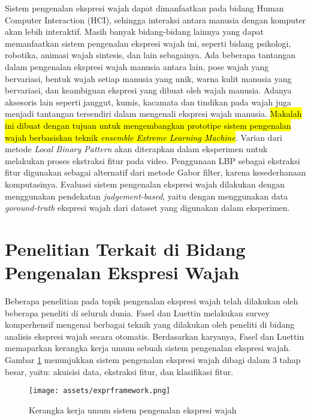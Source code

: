 \documentclass[review,3p,12pt]{elsarticle}
\begin{document}
Sistem pengenalan ekspresi wajah dapat dimanfaatkan pada bidang Human Computer Interaction (HCI), sehingga interaksi antara manusia dengan komputer akan lebih interaktif. Masih banyak bidang-bidang lainnya yang dapat memanfaatkan sistem pengenalan ekspresi wajah ini, seperti bidang psikologi, robotika, animasi wajah sintesis, dan lain sebagainya. Ada beberapa tantangan dalam pengenalan ekspresi wajah manusia antara lain, pose wajah yang bervariasi, bentuk wajah setiap manusia yang unik, warna kulit manusia yang bervariasi, dan keambiguan ekspresi yang dibuat oleh wajah manusia. Adanya aksesoris lain seperti janggut, kumis, kacamata dan tindikan pada wajah juga menjadi tantangan tersendiri dalam mengenali ekspresi wajah manusia. \hl{Makalah ini dibuat dengan tujuan untuk mengembangkan prototipe sistem pengenalan wajah berbasiskan teknik \textit{ensemble Extreme Learning Machine}}. Varian dari metode \textit{Local Binary Pattern} akan diterapkan dalam eksperimen untuk melakukan proses ekstraksi fitur pada video. Penggunaan LBP sebagai ekstraksi fitur digunakan sebagai alternatif dari metode Gabor filter, karena kesederhanaan komputasinya. Evaluasi sistem pengenalan ekspresi wajah dilakukan dengan menggunakan pendekatan \textit{judgement-based}, yaitu dengan menggunakan data \textit{goround-truth} ekspresi wajah dari dataset yang digunakan dalam eksperimen.


\section{Penelitian Terkait di Bidang Pengenalan Ekspresi Wajah}
\label{related}

Beberapa penelitian pada topik pengenalan ekspresi wajah telah dilakukan oleh beberapa peneliti di seluruh dunia. Fasel dan Luettin \cite{fasel2003automatic} melakukan survey komperhensif mengenai berbagai teknik yang dilakukan oleh peneliti di bidang analisis ekspresi wajah secara otomatis. Berdasarkan karyanya, Fasel dan Luettin memaparkan kerangka kerja umum sebuah sistem pengenalan ekspresi wajah. Gambar \ref{fig:exprframework} menunjukkan sistem pengenalan ekspresi wajah dibagi dalam 3 tahap besar, yaitu: akuisisi data, ekstraksi fitur, dan klasifikasi fitur.

\begin{figure}[hbt!]
\caption{Kerangka kerja umum sistem pengenalan ekspresi wajah \cite{fasel2003automatic}}
\label{fig:exprframework}
\centering
\texttt{[image: assets/exprframework.png]}
\end{figure}
\end{document}
